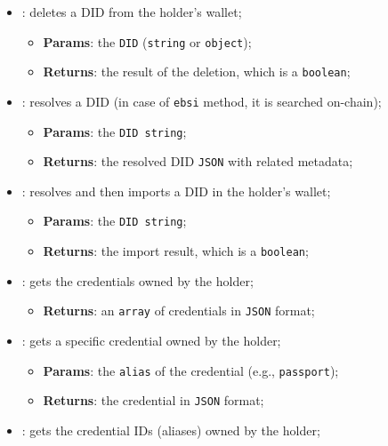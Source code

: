 \begin{itemize}
\begin{itemize}
\begin{itemize}
        \end{itemize}
        \item[] : deletes a DID from the holder's wallet;
        \begin{itemize}
            \item \textbf{Params}: the \texttt{DID} (\texttt{string} or \texttt{object});
            \item \textbf{Returns}: the result of the deletion, which is a \texttt{boolean};
        \end{itemize}
        \item[] : resolves a DID (in case of \texttt{ebsi} method, it is
        searched on-chain);
        \begin{itemize}
            \item \textbf{Params}: the \texttt{DID string};
            \item \textbf{Returns}: the resolved DID \texttt{JSON} with related metadata;
        \end{itemize}
        \item[] : resolves and then imports a DID in the holder's wallet;
        \begin{itemize}
            \item \textbf{Params}: the \texttt{DID string};
            \item \textbf{Returns}: the import result, which is a \texttt{boolean};
        \end{itemize}
        \item[] : gets the credentials owned by the holder;
        \begin{itemize}
            \item \textbf{Returns}: an \texttt{array} of credentials in \texttt{JSON} format;
        \end{itemize}
        \item[] : gets a specific credential owned by the holder;
        \begin{itemize}
            \item \textbf{Params}: the \texttt{alias} of the credential (e.g., \texttt{passport});
            \item \textbf{Returns}: the credential in \texttt{JSON} format;
        \end{itemize}
        \item[] : gets the credential IDs (aliases) owned by the holder;
        \begin{itemize}

\end{itemize}
\end{itemize}
\end{itemize}
